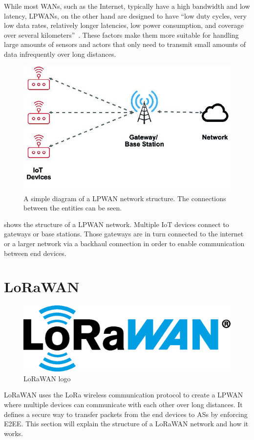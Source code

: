 While most \acp{WAN}, such as the Internet, typically have a high bandwidth and low latency, \acp{LPWAN}, on the other hand are designed to have ``low duty cycles, very low data rates, relatively longer latencies, low power consumption, and coverage over several kilometers''~\cite[p. 289]{kumar_connecting_2023}.
These factors make them more suitable for handling large amounts of sensors and actors that only need to transmit small amounts of data infrequently over long distances.

\begin{figure}[htbp]
    \centering
    \includegraphics[width=.5\textwidth]{pictures/lorawan-structure/lpwan_network_structure.jpg}
    \caption{
        A simple diagram of a \ac{LPWAN} network structure.
        The connections between the entities can be seen.\protect\cite{fernandez_assessing_2020}
    }\label{pic:lpwan-diagram}
\end{figure}

 shows the structure of a \ac{LPWAN} network.
Multiple \ac{IoT} devices connect to gateways or base stations.
Those gateways are in turn connected to the internet or a larger network via a backhaul connection in order to enable communication between end devices.

\section{\acf{LoRaWAN}}\label{sec:lorawan}

\begin{figure}[htbp]
    \centering
    \includegraphics[width=.3\textwidth]{pictures/logos/LoRaWAN_Logo.eps}
    \caption{
        \ac{LoRaWAN} logo~\protect\cite{lora_alliance_francais_2022}
    }
\end{figure}

\ac{LoRaWAN} uses the \ac{LoRa} wireless communication protocol to create a \ac{LPWAN} where multiple devices can communicate with each other over long distances.
It defines a secure way to transfer packets from the end devices to \acp{AS} by enforcing \ac{E2EE}.
This section will explain the structure of a \ac{LoRaWAN} network and how it works.

